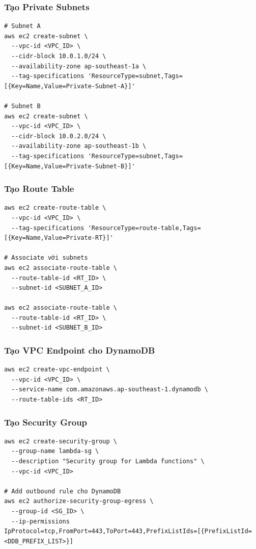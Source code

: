 \subsubsection{Tạo Private Subnets}

\begin{verbatim}
# Subnet A
aws ec2 create-subnet \
  --vpc-id <VPC_ID> \
  --cidr-block 10.0.1.0/24 \
  --availability-zone ap-southeast-1a \
  --tag-specifications 'ResourceType=subnet,Tags=[{Key=Name,Value=Private-Subnet-A}]'

# Subnet B
aws ec2 create-subnet \
  --vpc-id <VPC_ID> \
  --cidr-block 10.0.2.0/24 \
  --availability-zone ap-southeast-1b \
  --tag-specifications 'ResourceType=subnet,Tags=[{Key=Name,Value=Private-Subnet-B}]'
\end{verbatim}

\subsubsection{Tạo Route Table}

\begin{verbatim}
aws ec2 create-route-table \
  --vpc-id <VPC_ID> \
  --tag-specifications 'ResourceType=route-table,Tags=[{Key=Name,Value=Private-RT}]'

# Associate với subnets
aws ec2 associate-route-table \
  --route-table-id <RT_ID> \
  --subnet-id <SUBNET_A_ID>

aws ec2 associate-route-table \
  --route-table-id <RT_ID> \
  --subnet-id <SUBNET_B_ID>
\end{verbatim}

\subsubsection{Tạo VPC Endpoint cho DynamoDB}

\begin{verbatim}
aws ec2 create-vpc-endpoint \
  --vpc-id <VPC_ID> \
  --service-name com.amazonaws.ap-southeast-1.dynamodb \
  --route-table-ids <RT_ID>
\end{verbatim}

\subsubsection{Tạo Security Group}

\begin{verbatim}
aws ec2 create-security-group \
  --group-name lambda-sg \
  --description "Security group for Lambda functions" \
  --vpc-id <VPC_ID>

# Add outbound rule cho DynamoDB
aws ec2 authorize-security-group-egress \
  --group-id <SG_ID> \
  --ip-permissions IpProtocol=tcp,FromPort=443,ToPort=443,PrefixListIds=[{PrefixListId=<DDB_PREFIX_LIST>}]
\end{verbatim}

